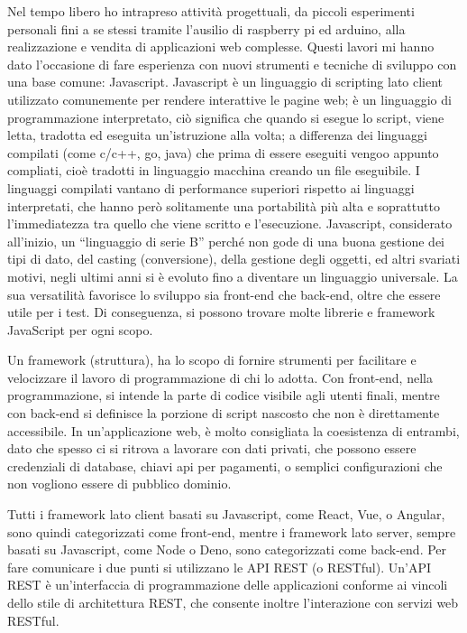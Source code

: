 \documentclass[12pt,a4paper]{article}
\begin{document}
Nel tempo libero ho intrapreso attività progettuali, da piccoli esperimenti personali fini a se stessi tramite l’ausilio di raspberry pi ed arduino, alla realizzazione e vendita di applicazioni web complesse. Questi lavori mi hanno dato l’occasione di fare esperienza con nuovi strumenti e tecniche di sviluppo con una base comune: Javascript.
Javascript è un linguaggio di scripting lato client utilizzato comunemente per rendere interattive le pagine web; è un linguaggio di programmazione interpretato, ciò significa che quando si esegue lo script, viene letta, tradotta ed eseguita un’istruzione alla volta; a differenza dei linguaggi compilati (come c/c++, go, java) che prima di essere eseguiti vengoo appunto compliati, cioè tradotti in linguaggio macchina  creando un file eseguibile. I linguaggi compilati vantano di performance superiori rispetto ai linguaggi interpretati, che hanno però solitamente una portabilità più alta e soprattutto l’immediatezza tra quello che viene scritto e l’esecuzione.
Javascript, considerato all’inizio, un “linguaggio di serie B” perché non gode di una buona gestione dei tipi di dato, del casting (conversione), della gestione degli oggetti, ed altri svariati motivi, negli ultimi anni si è evoluto fino a diventare un linguaggio universale. La sua versatilità favorisce lo sviluppo sia front-end che back-end, oltre che essere utile per i test. Di conseguenza, si possono trovare molte librerie e framework JavaScript per ogni scopo.

Un framework (struttura), ha lo scopo di fornire strumenti per facilitare e velocizzare il lavoro di programmazione di chi lo adotta.
Con front-end, nella programmazione, si intende la parte di codice visibile agli utenti finali, mentre con back-end si definisce la porzione di script nascosto che non è direttamente accessibile.
In un’applicazione web, è molto consigliata la coesistenza di entrambi, dato che spesso ci si ritrova a lavorare con dati privati, che possono essere credenziali di database, chiavi api per pagamenti, o semplici configurazioni che non vogliono essere di pubblico dominio.

Tutti i framework lato client basati su Javascript, come React, Vue, o Angular, sono quindi categorizzati come front-end, mentre i framework lato server, sempre basati su Javascript, come Node o Deno, sono categorizzati come back-end. Per fare comunicare i due punti si utilizzano le API REST (o RESTful). Un'API REST è un'interfaccia di programmazione delle applicazioni conforme ai vincoli dello stile di architettura REST, che consente inoltre l'interazione con servizi web RESTful.
\end{document}

